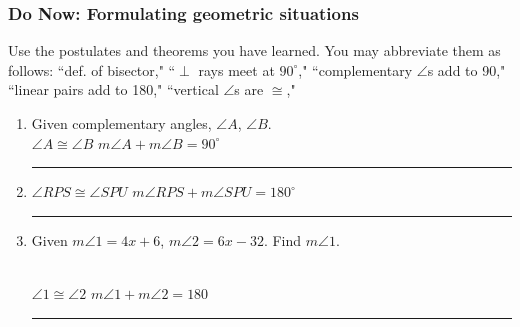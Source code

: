\documentclass[12pt, oneside]{article}
\begin{document}
\subsubsection*{Do Now: Formulating geometric situations}
  \vspace{0.5cm}
  Use the postulates and theorems you have learned. You may abbreviate them as follows: ``def. of bisector," ``$\perp$ rays meet at $90^\circ$," ``complementary $\angle$s add to 90," ``linear pairs add to 180," ``vertical $\angle$s are $\cong$,"

  \begin{enumerate}

\subsubsection*{Circle the appropriate equation and state the justification}

  \item Given complementary angles, $\angle A$, $\angle B$.\\[0.5cm]
  $\angle A \cong \angle B$ \hspace{1cm} $m \angle A + m \angle B=90^\circ$ \hspace{0.5cm} \rule{5cm}{0.15mm} \vspace{0.25cm}

  \item $\angle RPS \cong \angle SPU$ \hspace{0.25cm} $m \angle RPS + m \angle SPU = 180^\circ$ \hspace{0.25cm} \rule{6cm}{0.15mm}  \vspace{0.25cm}

  \item Given $m \angle 1 = 4x+6$, $m \angle 2 = 6x-32$. Find $m \angle 1$.
      \\[0.5cm]
      $\angle 1 \cong \angle 2$ \hspace{1cm} $m\angle 1 + m\angle 2 =  180$ \hspace{0.5cm} \rule{6cm}{0.15mm}


\end{enumerate}
\end{document}
